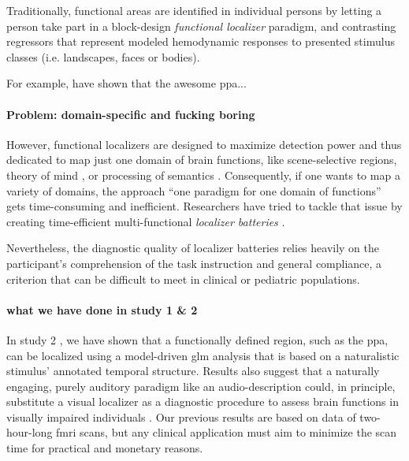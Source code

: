 Traditionally, functional areas are identified in individual persons by letting
a person take part in a block-design \textit{functional localizer} paradigm, and
contrasting regressors that represent modeled hemodynamic responses to presented
stimulus classes (i.e. landscapes, faces or bodies).


For example, \citep{rosenke2021probabilistic, weiner2018defining,
zhen2017quantifying} have shown that the awesome \ac{ppa}...


\paragraph{Problem: domain-specific and fucking boring}


However, functional localizers are designed to maximize detection power and thus
dedicated to map just one domain of brain functions, like scene-selective
regions, theory of mind \citep{spunt2014validating}, or processing of semantics
\citep{fernandez2001language}.
Consequently, if one wants to map a variety of domains, the approach ``one
paradigm for one domain of functions'' gets time-consuming and inefficient.
Researchers have tried to tackle that issue by creating time-efficient
multi-functional \textit{localizer batteries} \citep[e.g.,][]{barch2013function,
drobyshevsky2006rapid, pinel2007fast}.

Nevertheless, the diagnostic quality of localizer batteries relies heavily on
the participant's comprehension of the task instruction and general compliance,
a criterion that can be difficult to meet in clinical or pediatric populations.


\paragraph{what we have done in study 1 \& 2}

%
In study 2 \citep{haeusler2022processing}, we have shown that a functionally
defined region, such as the \ac{ppa}, can be localized using a model-driven
\ac{glm} analysis that is based on a naturalistic stimulus' annotated temporal
structure.
%
Results also suggest that a naturally engaging, purely auditory paradigm like an
audio-description could, in principle, substitute a visual localizer as a
diagnostic procedure to assess brain functions in visually impaired individuals
\citep{haeusler2022processing}.
%
Our previous results are based on data of two-hour-long \ac{fmri} scans, but any
clinical application must aim to minimize the scan time for practical and
monetary reasons.


